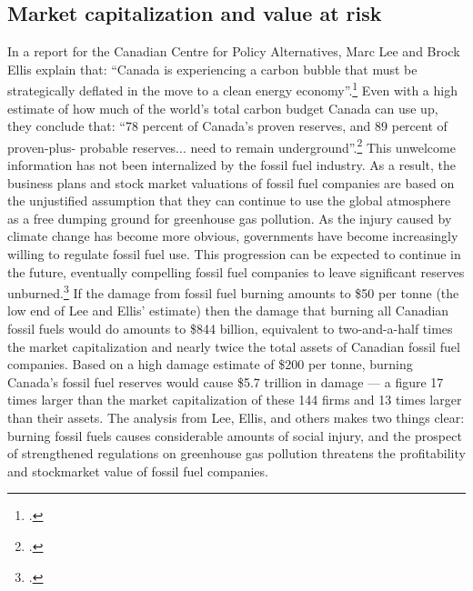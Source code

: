 \documentclass[10pt]{article}
\begin{document}
	\subsection {Market capitalization and value at risk}



In a report for the Canadian Centre for Policy Alternatives, Marc Lee and Brock Ellis explain that: ``Canada is experiencing a carbon bubble that must be strategically deflated in the move to a clean energy economy''.\footcite[][p.5]{CanadaCarbonLiabilities}
Even with a high estimate of how much of the world's total carbon budget Canada can use up, they conclude that: ``78 percent of Canada’s proven reserves, and 89 percent of proven-plus- probable reserves... need to remain underground''.\footcite[][p.6]{CanadaCarbonLiabilities}
This unwelcome information has not been internalized by the fossil fuel industry.
As a result, the business plans and stock market valuations of fossil fuel companies are based on the unjustified assumption that they can continue to use the global atmosphere as a free dumping ground for greenhouse gas pollution.
As the injury caused by climate change has become more obvious, governments have become increasingly willing to regulate fossil fuel use.
This progression can be expected to continue in the future, eventually compelling fossil fuel companies to leave significant reserves unburned.\footcite[See, for instance: ][]{ThreatenGrowth}
If the damage from fossil fuel burning amounts to \$50 per tonne (the low end of Lee and Ellis' estimate) then the damage that burning all Canadian fossil fuels would do amounts to \$844 billion, equivalent to two-and-a-half times the market capitalization and nearly twice the total assets of Canadian fossil fuel companies.
Based on a high damage estimate of \$200 per tonne, burning Canada's fossil fuel reserves would cause \$5.7 trillion in damage --- a figure 17 times larger than the market capitalization of these 144 firms and 13 times larger than their assets.
The analysis from Lee, Ellis, and others makes two things clear: burning fossil fuels causes considerable amounts of social injury, and the prospect of strengthened regulations on greenhouse gas pollution threatens the profitability and stockmarket value of fossil fuel companies.
\end{document}
